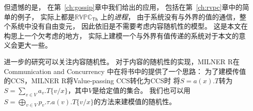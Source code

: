 但遗憾的是，
在第~\ref{ch:gossip}章中我们给出的应用，
包括在第~\ref{ch:rvpc}章中的简单的例子，
实际上都是$\mathbb{RVPC}_{\mathsf{Th}}$
上的\textit{进程}，
由于系统没有与外界的值的通信，整个系统中没有自由变元，
因此依旧是不需要考虑内容随机性的模型。
这是本文在构思上一个欠考虑的地方，
实际上建模一个与外界有值传递的系统对于本文的意义会更大一些。

进一步的研究可以关注内容随机性。
对于内容的随机性的实现，MILNER R在Communication and Concurrency\cite{Milner_CCS}
中在将书中的提供了一个思路：
为了建模传值的CCS，MILNER R将Value-passing CCS转化为CCS时
将$S=a(x).T$转为$S=\sum_{v\in V} a_v.T\{v/x\}$，其中$V$是给定值的集合。
我们也可以用$S=\bigoplus_{v\in V}p_v.\tau.a(v).T\{v/x\}$的方法来建模值的随机性。